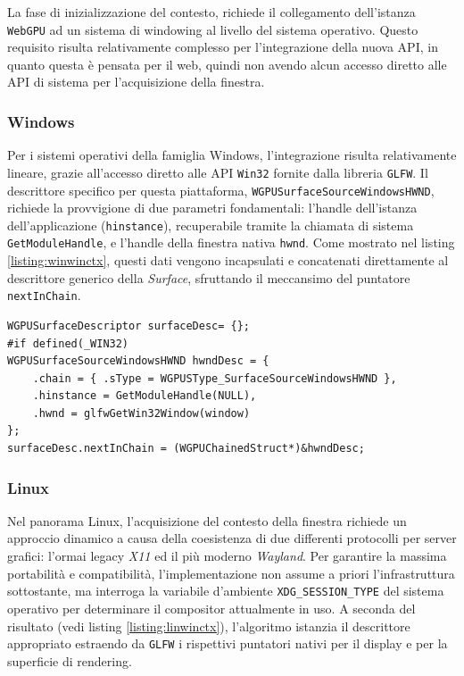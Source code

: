 \documentclass[a4paper, 11pt, twoside]{report}
\begin{document}
La fase di inizializzazione del contesto, richiede il collegamento dell'istanza \texttt{WebGPU} ad un sistema di
windowing al livello del sistema operativo.
Questo requisito risulta relativamente complesso per l'integrazione della nuova API, in quanto questa è pensata per il
web, quindi non avendo alcun accesso diretto alle API di sistema per l'acquisizione della finestra.

\subsubsection{Windows}

Per i sistemi operativi della famiglia Windows, l'integrazione risulta relativamente lineare, grazie all'accesso diretto
alle API \texttt{Win32} fornite dalla libreria \texttt{GLFW}. Il descrittore specifico per questa piattaforma,
\texttt{WGPUSurfaceSourceWindowsHWND}, richiede la provvigione di due parametri fondamentali: l'handle dell'istanza
dell'applicazione (\texttt{hinstance}), recuperabile tramite la chiamata di sistema \texttt{GetModuleHandle}, e l'handle
della finestra nativa \texttt{hwnd}.
Come mostrato nel listing \ref{listing:winwinctx}, questi dati vengono incapsulati e concatenati direttamente al
descrittore generico della \textit{Surface}, sfruttando il meccansimo del puntatore \texttt{\gls{nextInChain}}.

\begin{listing}[!ht]
\begin{verbatim}
WGPUSurfaceDescriptor surfaceDesc= {};
#if defined(_WIN32)
WGPUSurfaceSourceWindowsHWND hwndDesc = {
    .chain = { .sType = WGPUSType_SurfaceSourceWindowsHWND },
    .hinstance = GetModuleHandle(NULL),
    .hwnd = glfwGetWin32Window(window)
};
surfaceDesc.nextInChain = (WGPUChainedStruct*)&hwndDesc;
\end{verbatim}
\vspace{-0.75cm}
\caption{Inizializzazione contesto finestra (Windows)}
\label{listing:winwinctx}
\end{listing}
\vspace{-0.75cm}

\subsubsection{Linux}

Nel panorama Linux, l'acquisizione del contesto della finestra richiede un approccio dinamico a causa della coesistenza
di due differenti protocolli per server grafici: l'ormai legacy \textit{X11} ed il più moderno \textit{Wayland}. Per
garantire la massima portabilità e compatibilità, l'implementazione non assume a priori l'infrastruttura sottostante,
ma interroga la variabile d'ambiente \texttt{XDG\_SESSION\_TYPE} del sistema operativo per determinare il compositor
attualmente in uso.
A seconda del risultato (vedi listing \ref{listing:linwinctx}), l'algoritmo istanzia il descrittore appropriato
estraendo da \texttt{GLFW} i rispettivi puntatori nativi per il display e per la superficie di rendering.
\end{document}
